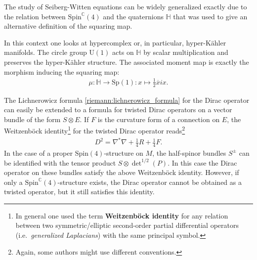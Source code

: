     \begin{remark}
        The study of Seiberg-Witten equations can be widely generalized exactly due to the relation between $\mathrm{Spin}^\mathbb{C}(4)$ and the quaternions $\mathbb{H}$ that was used to give an alternative definition of the squaring map.

        In this context one looks at hypercomplex or, in particular, hyper-K\"ahler manifolds. The circle group $\mathrm{U}(1)$ acts on $\mathbb{H}$ by scalar multiplication and preserves the hyper-K\"ahler structure. The associated moment map is exactly the morphism inducing the squaring map:
        \begin{gather}
            \mu:\mathbb{H}\rightarrow\mathrm{Sp}(1):x\mapsto\frac{1}{2}\overline{x}ix.
        \end{gather}
    \end{remark}

    \begin{property}
        The Lichnerowicz formula \ref{riemann:lichnerowicz_formula} for the Dirac operator can easily be extended to a formula for twisted Dirac operators on a vector bundle of the form $S\otimes E$. If $F$ is the curvature form of a connection on $E$, the Weitzenb\"ock identity\footnote{In general one used the term \textbf{Weitzenb\"ock identity} for any relation between two symmetric/elliptic second-order partial differential operators (i.e.~\textit{generalized Laplacians}) with the same principal symbol.} for the twisted Dirac operator reads\footnote{Again, some authors might use different conventions.}
        \begin{gather}
            D^2 = \nabla^*\nabla+\frac{1}{4}R+\frac{1}{4}F.
        \end{gather}
        In the case of a proper $\mathrm{Spin}(4)$-structure on $M$, the half-spinor bundles $S^\pm$ can be identified with the tensor product $S\otimes\det^{1/2}(P)$. In this case the Dirac operator on these bundles satisfy the above Weitzenb\"ock identity. However, if only a $\mathrm{Spin}^\mathbb{C}(4)$-structure exists, the Dirac operator cannot be obtained as a twisted operator, but it still satisfies this identity.
    \end{property}

